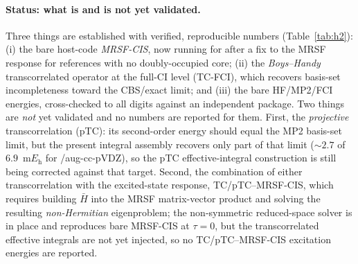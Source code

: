 \documentclass[aps,prb,reprint,superscriptaddress,floatfix]{revtex4-2}
\newcommand{\Hbar}{\bar{H}}
\begin{document}
\paragraph{Status: what is and is not yet validated.}\label{sec:status}
Three things are established with verified, reproducible numbers (Table~\ref{tab:h2}):
(i) the bare host-code \emph{MRSF-CIS}, now running for  after a fix to the
MRSF response for references with no doubly-occupied core; (ii) the \emph{Boys--Handy}
transcorrelated operator at the full-CI level (TC-FCI), which recovers basis-set
incompleteness toward the CBS/exact limit; and (iii) the bare HF/MP2/FCI energies,
cross-checked to all digits against an independent package. Two things are
\emph{not} yet validated and no numbers are reported for them. First, the
\emph{projective} transcorrelation (pTC): its second-order energy should equal the
MP2 basis-set limit, but the present integral assembly recovers only part of that
limit ($\sim\!2.7$ of $6.9$~m$E_\mathrm{h}$ for /aug-cc-pVDZ), so the pTC
effective-integral construction is still being corrected against that target. Second,
the combination of either transcorrelation with the excited-state response,
TC/pTC--MRSF-CIS, which requires building $\Hbar$ into the MRSF matrix-vector product
and solving the resulting \emph{non-Hermitian} eigenproblem; the non-symmetric
reduced-space solver is in place and reproduces bare MRSF-CIS at $\tau=0$, but the
transcorrelated effective integrals are not yet injected, so no TC/pTC--MRSF-CIS
excitation energies are reported.
\end{document}
